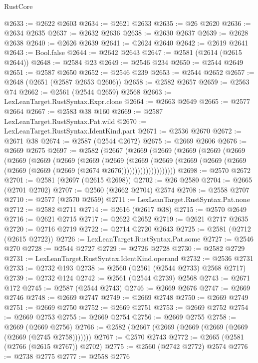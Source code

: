 \begin{lexlean}{RustCore}
\begin{coremodule}
@2633 := @2622 @2603
@2634 := @2621 @2633
@2635 := @26 @2620
@2636 := @2634 @2635
@2637 := @2632 @2636
@2638 := @2630 @2637
@2639 := @2628 @2638
@2640 := @2626 @2639
@2641 := @2624 @2640
@2642 := @2619 @2641
@2643 := Bool.false
@2644 := @2642 @2643
@2647 := @2581 (@2614 (@2615 @2644))
@2648 := @2584 @23
@2649 := @2546 @234
@2650 := @2544 @2649
@2651 := @2587 @2650
@2652 := @2546 @239
@2653 := @2544 @2652
@2657 := @2648 (@2651 (@2587 @2653 @2606))
@2658 := @2582 @2657
@2659 := @2563 @74
@2662 := @2561 (@2544 @2659) @2568
@2663 := LexLeanTarget.RustSyntax.Expr.clone
@2664 := @2663 @2649
@2665 := @2577 @2664
@2667 := @2583 @38 @160
@2669 := @2587 LexLeanTarget.RustSyntax.Pat.wild
@2670 := LexLeanTarget.RustSyntax.IdentKind.part
@2671 := @2536 @2670
@2672 := @2671 @38
@2674 := @2587 (@2544 @2672)
@2675 := @2669 @2606
@2676 := @2669 @2675
@2697 := @2582
    (@2667
      (@2669
        (@2669
          (@2669
            (@2669
              (@2669
                (@2669
                  (@2669
                    (@2669
                      (@2669
                        (@2669
                          (@2669
                            (@2669
                              (@2669
                                (@2669 (@2669 (@2669 (@2669 (@2669 (@2674 @2676))))))))))))))))))))
@2698 := @2570 @2672
@2701 := @2581 (@2697 (@2615 @2698))
@2702 := @26 @2580
@2704 := @2665 (@2701 @2702)
@2707 := @2560 (@2662 @2704) @2574
@2708 := @2558 @2707
@2710 := @2577 (@2570 @2659)
@2711 := LexLeanTarget.RustSyntax.Pat.none
@2712 := @2582 @2711
@2714 := @2616 (@2617 @38)
@2715 := @2570 @2649
@2716 := @2621 @2715
@2717 := @2622 @2652
@2719 := @2621 @2717 @2635
@2720 := @2716 @2719
@2722 := @2714 @2720 @2643
@2725 := @2581 (@2712 (@2615 @2722))
@2726 := LexLeanTarget.RustSyntax.Pat.some
@2727 := @2546 @270
@2728 := @2544 @2727
@2729 := @2726 @2728
@2730 := @2582 @2729
@2731 := LexLeanTarget.RustSyntax.IdentKind.operand
@2732 := @2536 @2731
@2733 := @2732 @193
@2738 := @2560 (@2561 (@2544 @2733) @2568 @2717)
@2739 := @2732 @124
@2742 := @2561 (@2544 @2739) @2568
@2743 := @2671 @172
@2745 := @2587 (@2544 @2743)
@2746 := @2669 @2676
@2747 := @2669 @2746
@2748 := @2669 @2747
@2749 := @2669 @2748
@2750 := @2669 @2749
@2751 := @2669 @2750
@2752 := @2669 @2751
@2753 := @2669 @2752
@2754 := @2669 @2753
@2755 := @2669 @2754
@2756 := @2669 @2755
@2758 := @2669 (@2669 @2756)
@2766 := @2582 (@2667 (@2669 (@2669 (@2669 (@2669 (@2669 (@2745 @2758)))))))
@2767 := @2570 @2743
@2772 := @2665 (@2581 (@2766 (@2615 @2767)) @2702)
@2775 := @2560 (@2742 @2772) @2574
@2776 := @2738 @2775
@2777 := @2558 @2776

\end{coremodule}
\end{lexlean}

